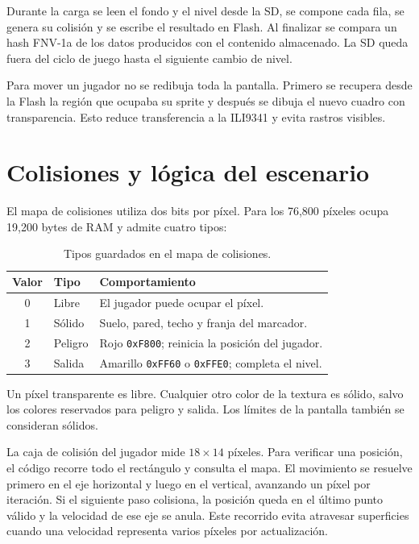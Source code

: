 \documentclass[11pt,letterpaper]{article}
\begin{document}
Durante la carga se leen el fondo y el nivel desde la SD, se compone cada fila, se
genera su colisión y se escribe el resultado en Flash. Al finalizar se compara un
hash FNV-1a de los datos producidos con el contenido almacenado. La SD queda fuera
del ciclo de juego hasta el siguiente cambio de nivel.

Para mover un jugador no se redibuja toda la pantalla. Primero se recupera desde la
Flash la región que ocupaba su sprite y después se dibuja el nuevo cuadro con
transparencia. Esto reduce transferencia a la ILI9341 y evita rastros visibles.

\section{Colisiones y lógica del escenario}

El mapa de colisiones utiliza dos bits por píxel. Para los 76,800 píxeles ocupa
19,200 bytes de RAM y admite cuatro tipos:

\begin{table}[h]
\centering
\caption{Tipos guardados en el mapa de colisiones.}
\begin{tabular}{@{}cll@{}}
\toprule
\textbf{Valor} & \textbf{Tipo} & \textbf{Comportamiento} \\
\midrule
0 & Libre & El jugador puede ocupar el píxel. \\
1 & Sólido & Suelo, pared, techo y franja del marcador. \\
2 & Peligro & Rojo \texttt{0xF800}; reinicia la posición del jugador. \\
3 & Salida & Amarillo \texttt{0xFF60} o \texttt{0xFFE0}; completa el nivel. \\
\bottomrule
\end{tabular}
\end{table}

Un píxel transparente es libre. Cualquier otro color de la textura es sólido, salvo
los colores reservados para peligro y salida. Los límites de la pantalla también se
consideran sólidos.

La caja de colisión del jugador mide $18\times14$ píxeles. Para verificar una
posición, el código recorre todo el rectángulo y consulta el mapa. El movimiento se
resuelve primero en el eje horizontal y luego en el vertical, avanzando un píxel por
iteración. Si el siguiente paso colisiona, la posición queda en el último punto
válido y la velocidad de ese eje se anula. Este recorrido evita atravesar superficies
cuando una velocidad representa varios píxeles por actualización.
\end{document}
